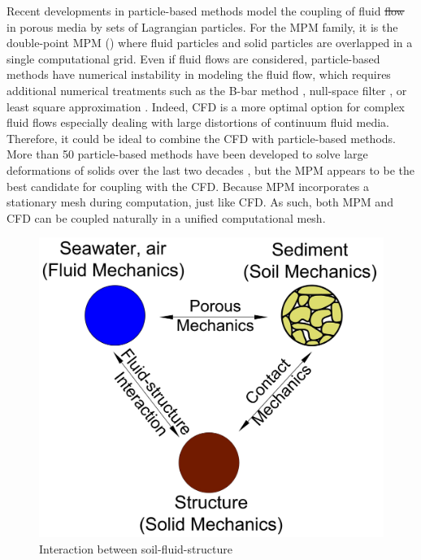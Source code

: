 \documentclass[preprint,12pt]{elsarticle}
\providecommand{\DIFadd}[1]{{\protect\color{blue}\uwave{#1}}} %
\providecommand{\DIFdel}[1]{{\protect\color{red}\sout{#1}}}                      %
\providecommand{\DIFaddbegin}{} %
\providecommand{\DIFaddend}{} %
\providecommand{\DIFdelbegin}{} %
\providecommand{\DIFdelend}{} %
\newcommand{\DIFscaledelfig}{0.5}
\newlength{\DIFdelgraphicswidth} %
\newlength{\DIFdelgraphicsheight} %
\newcommand{\DIFaddincludegraphics}[2][]{{\color{blue}\fbox{\DIFOincludegraphics[#1]{#2}}}} %
\newcommand{\DIFdelincludegraphics}[2][]{%
\sbox{\DIFdelgraphicsbox}{\DIFOincludegraphics[#1]{#2}}%
\settoboxwidth{\DIFdelgraphicswidth}{\DIFdelgraphicsbox} %
\settoboxtotalheight{\DIFdelgraphicsheight}{\DIFdelgraphicsbox} %
\scalebox{\DIFscaledelfig}{%
\parbox[b]{\DIFdelgraphicswidth}{\usebox{\DIFdelgraphicsbox}\\[-\baselineskip] \rule{\DIFdelgraphicswidth}{0em}}\llap{\resizebox{\DIFdelgraphicswidth}{\DIFdelgraphicsheight}{%
\setlength{\unitlength}{\DIFdelgraphicswidth}%
\begin{picture}(1,1)%
\thicklines\linethickness{2pt} %
{\color[rgb]{1,0,0}\put(0,0){\framebox(1,1){}}}%
{\color[rgb]{1,0,0}\put(0,0){\line( 1,1){1}}}%
{\color[rgb]{1,0,0}\put(0,1){\line(1,-1){1}}}%
\end{picture}%
}\hspace*{3pt}}} %
} %
\DeclareRobustCommand{\DIFaddbegin}{\DIFOaddbegin \let\includegraphics\DIFaddincludegraphics} %
\DeclareRobustCommand{\DIFaddend}{\DIFOaddend \let\includegraphics\DIFOincludegraphics} %
\DeclareRobustCommand{\DIFdelbegin}{\DIFOdelbegin \let\includegraphics\DIFdelincludegraphics} %
\DeclareRobustCommand{\DIFdelend}{\DIFOaddend \let\includegraphics\DIFOincludegraphics} %
\begin{document}
Recent developments in particle-based methods model the coupling of fluid \DIFdelbegin \DIFdel{flow }\DIFdelend \DIFaddbegin \DIFadd{flows }\DIFaddend in porous media by sets of Lagrangian particles. For the MPM family, it is the double-point MPM (\cite{Bandara2015, Tampubolon2017, Baumgarten2019}) where fluid particles and solid particles are overlapped in a single computational grid. Even if fluid flows are considered, particle-based methods have numerical instability in modeling the fluid flow, which requires additional numerical treatments such as the B-bar method \cite{Bandara2015}, null-space filter \cite{nullspace}, or least square approximation \cite{Zheng2021, CPLS}. Indeed, CFD is a more optimal option for complex fluid flows especially dealing with large distortions of continuum fluid media. Therefore, it could be ideal to combine the CFD with particle-based methods. More than 50 particle-based methods have been developed to solve large deformations of solids over the last two decades \cite{Chen2017}, but the MPM appears to be the best candidate for coupling with the CFD. Because MPM incorporates a stationary mesh during computation, just like CFD. As such, both MPM and CFD can be coupled naturally in a unified computational mesh.\\
%
%
\begin{figure}[h]
\center
\includegraphics[scale=.3]{3phases.jpg}
\caption{Interaction between soil-fluid-structure}
\label{fig:3phases}
\end{figure}
%
%
\end{document}
